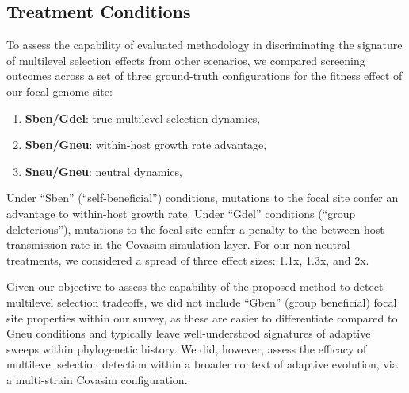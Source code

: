 \subsection{Treatment Conditions}

To assess the capability of evaluated methodology in discriminating the signature of multilevel selection effects from other scenarios, we compared screening outcomes across a set of three ground-truth configurations for the fitness effect of our focal genome site:
\begin{enumerate}[noitemsep,topsep=0pt,parsep=0pt,partopsep=0pt]
\item \textbf{Sben/Gdel}: true multilevel selection dynamics,
\item \textbf{Sben/Gneu}: within-host growth rate advantage,
\item \textbf{Sneu/Gneu}: neutral dynamics,
\end{enumerate}

Under ``Sben'' (``self-beneficial'') conditions, mutations to the focal site confer an advantage to within-host growth rate.
Under ``Gdel'' conditions (``group deleterious''), mutations to the focal site confer a penalty to the between-host transmission rate in the Covasim simulation layer.
For our non-neutral treatments, we considered a spread of three effect sizes: 1.1x, 1.3x, and 2x.

Given our objective to assess the capability of the proposed method to detect multilevel selection tradeoffs, we did not include ``Gben'' (group beneficial) focal site properties within our survey, as these are easier to differentiate compared to Gneu conditions and typically leave well-understood signatures of adaptive sweeps within phylogenetic history.
We did, however, assess the efficacy of multilevel selection detection within a broader context of adaptive evolution, via a multi-strain Covasim configuration.



